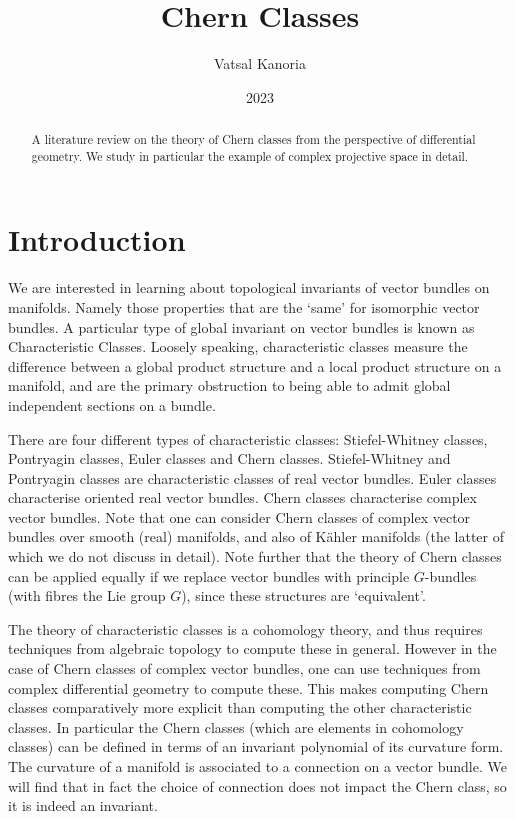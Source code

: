 \documentclass[a4paper]{article}
\theoremstyle{definition} \newtheorem*{definition}{Definition}
\theoremstyle{definition} \newtheorem*{definitions}{Definitions}
\theoremstyle{plain} \newtheorem{theorem}{Theorem}[section]
\theoremstyle{plain} \newtheorem{proposition}[theorem]{Proposition}
\theoremstyle{plain} \newtheorem{corollary}[theorem]{Corollary}
\theoremstyle{plain} \newtheorem{lemma}[theorem]{Lemma}
\theoremstyle{plain} \newtheorem{example}[theorem]{Example}
\begin{document}
\title{Chern Classes}
\author{Vatsal Kanoria}
\date{2023}
\maketitle

\begin{abstract}
A literature review on the theory of Chern classes from the perspective of differential geometry. We study in particular the example of complex projective space in detail. 
\end{abstract}

\tableofcontents

\section{Introduction}

We are interested in learning about topological invariants of vector bundles on manifolds. Namely those properties that are the `same' for isomorphic vector bundles. A particular type of global invariant on vector bundles is known as Characteristic Classes. Loosely speaking, characteristic classes measure the difference between a global product structure and a local product structure on a manifold, and are the primary obstruction to being able to admit global independent sections on a bundle. 

There are four different types of characteristic classes: Stiefel-Whitney classes, Pontryagin classes, Euler classes and Chern classes. Stiefel-Whitney and Pontryagin classes are characteristic classes of real vector bundles. Euler classes  characterise oriented real vector bundles.
Chern classes characterise complex vector bundles. 
Note that one can consider Chern classes of complex vector bundles over smooth (real) manifolds, and also of K{\"a}hler manifolds (the latter of which we do not discuss in detail). Note further that the theory of Chern classes can be applied equally if we replace vector bundles with principle $G$-bundles (with fibres the Lie group $G$), since these structures are `equivalent'. 

The theory of characteristic classes is a cohomology theory, and thus requires techniques from algebraic topology to compute these in general. However in the case of Chern classes of complex vector bundles, one can use techniques from complex differential geometry to compute these. This makes computing Chern classes comparatively more explicit than computing the other characteristic classes. In particular the Chern classes (which are elements in cohomology classes) can be defined in terms of an invariant polynomial of its curvature form. The curvature of a manifold is associated to a connection on a vector bundle. We will find that in fact the choice of connection does not impact the Chern class, so it is indeed an invariant.
\end{document}

